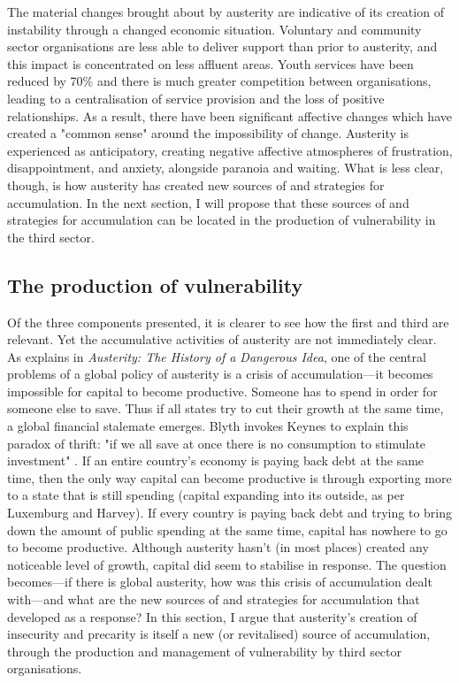 The material changes brought about by austerity are indicative of its creation of instability through a changed economic situation. Voluntary and community sector organisations are less able to deliver support than prior to austerity, and this impact is concentrated on less affluent areas. Youth services have been reduced by 70\% and there is much greater competition between organisations, leading to a centralisation of service provision and the loss of positive relationships. As a result, there have been significant affective changes which have created a "common sense" around the impossibility of change. Austerity is experienced as anticipatory, creating negative affective atmospheres of frustration, disappointment, and anxiety, alongside paranoia and waiting. What is less clear, though, is how austerity has created new sources of and strategies for accumulation. In the next section, I will propose that these sources of and strategies for accumulation can be located in the production of vulnerability in the third sector.

\subsection{The production of vulnerability}
\label{subsec:the-production-of-vulnerability}

Of the three components presented, it is clearer to see how the first and third are relevant. Yet the accumulative activities of austerity are not immediately clear. As \citet{blyth_austerity_2013} explains in \emph{Austerity: The History of a Dangerous Idea}, one of the central problems of a global policy of austerity is a crisis of accumulation—it becomes impossible for capital to become productive. Someone has to spend in order for someone else to save. Thus if all states try to cut their growth at the same time,  a global financial stalemate emerges. Blyth invokes Keynes to explain this paradox of thrift: "if we all save at once there is no consumption to stimulate investment" \citep[p. 8]{blyth_austerity_2013}. If an entire country's economy is paying back debt at the same time, then the only way capital can become productive is through exporting more to a state that is still spending (capital expanding into its outside, as per Luxemburg and Harvey). If every country is paying back debt and trying to bring down the amount of public spending at the same time, capital has nowhere to go to become productive. Although austerity hasn't (in most places) created any noticeable level of growth, capital did seem to stabilise in response. The question becomes—if there is global austerity, how was this crisis of accumulation dealt with—and what are the new sources of and strategies for accumulation that developed as a response? In this section, I argue that austerity's creation of insecurity and precarity is itself a new (or revitalised) source of accumulation, through the production and management of vulnerability by third sector organisations. 

